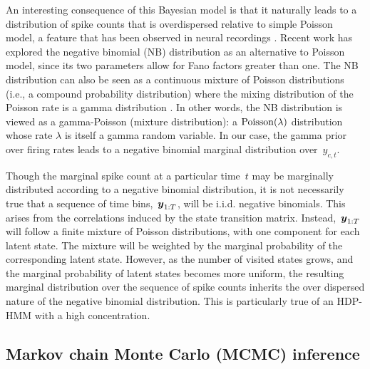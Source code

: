 An interesting consequence of this Bayesian model is that it naturally leads to a distribution of spike counts that is overdispersed relative to simple Poisson model, a feature that has been observed in neural recordings \citep{Goris14}. Recent work has explored the negative binomial (NB) distribution as an alternative to Poisson model, since its two parameters allow for Fano factors greater than one.  The NB distribution can also be seen as a continuous mixture of Poisson distributions (i.e., a compound probability distribution) where the mixing distribution of the Poisson rate is a gamma distribution \citep{Gelman13}. In other words, the NB distribution is viewed as a gamma-Poisson (mixture distribution): 
a $\mathrm{Poisson}(\lambda)$ distribution whose rate  $\lambda$ is itself a gamma random variable. In our case, the gamma prior over firing rates leads to a negative binomial marginal distribution over~$y_{c,t}$.

Though the marginal spike count at a particular time~$t$ may be marginally distributed according to a negative binomial distribution, it is not necessarily true that a sequence of time bins,~$\boldsymbol{y}_{1:T}$, will be i.i.d. negative binomials. This arises from the correlations induced by the state transition matrix. Instead,~$\boldsymbol{y}_{1:T}$ will follow a finite mixture of Poisson distributions, with one component for each latent state. The mixture will be weighted by the marginal probability of the corresponding latent state. However, as the number of visited states grows, and the marginal probability of latent states becomes more uniform, the resulting marginal distribution over the sequence of spike counts inherits the over dispersed nature of the negative binomial distribution. This is particularly true of an HDP-HMM with a high concentration.

 \subsection{Markov chain Monte Carlo (MCMC) inference}


